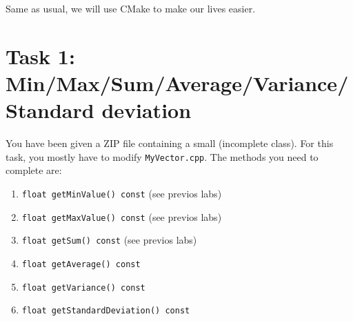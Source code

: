 \documentclass[english,a4paper,12pt,oneside]{article}
\begin{document}
Same as usual, we will use CMake to make our lives easier. 

\section*{Task 1: Min/Max/Sum/Average/Variance/Standard deviation}

You have been given a ZIP file containing a small (incomplete class). 
For this task, you mostly have to modify \verb+MyVector.cpp+.
The methods you need to complete are:
\begin{enumerate}
 \item \verb+float getMinValue() const+ (see previos labs)
 \item \verb+float getMaxValue() const+ (see previos labs)
 \item \verb+float getSum() const+ (see previos labs)
 \item \verb+float getAverage() const+
 \item \verb+float getVariance() const+
 \item \verb+float getStandardDeviation() const+
\end{enumerate}
\end{document}
